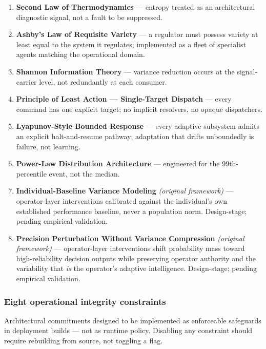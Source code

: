 \begin{enumerate}
\def\labelenumi{\arabic{enumi}.}
\tightlist
\item
  \textbf{Second Law of Thermodynamics} --- entropy treated as an
  architectural diagnostic signal, not a fault to be suppressed.
\item
  \textbf{Ashby's Law of Requisite Variety} --- a regulator must possess
  variety at least equal to the system it regulates; implemented as a
  fleet of specialist agents matching the operational domain.
\item
  \textbf{Shannon Information Theory} --- variance reduction occurs at
  the signal-carrier level, not redundantly at each consumer.
\item
  \textbf{Principle of Least Action --- Single-Target Dispatch} ---
  every command has one explicit target; no implicit resolvers, no
  opaque dispatchers.
\item
  \textbf{Lyapunov-Style Bounded Response} --- every adaptive subsystem
  admits an explicit halt-and-resume pathway; adaptation that drifts
  unboundedly is failure, not learning.
\item
  \textbf{Power-Law Distribution Architecture} --- engineered for the
  99th-percentile event, not the median.
\item
  \textbf{Individual-Baseline Variance Modeling} \emph{(original
  framework)} --- operator-layer interventions calibrated against the
  individual's own established performance baseline, never a population
  norm. Design-stage; pending empirical validation.
\item
  \textbf{Precision Perturbation Without Variance Compression}
  \emph{(original framework)} --- operator-layer interventions shift
  probability mass toward high-reliability decision outputs while
  preserving operator authority and the variability that \emph{is} the
  operator's adaptive intelligence. Design-stage; pending empirical
  validation.
\end{enumerate}

\subsubsection{Eight operational integrity
constraints}\label{eight-operational-integrity-constraints}

Architectural commitments designed to be implemented as enforceable
safeguards in deployment builds --- not as runtime policy. Disabling any
constraint should require rebuilding from source, not toggling a flag.

